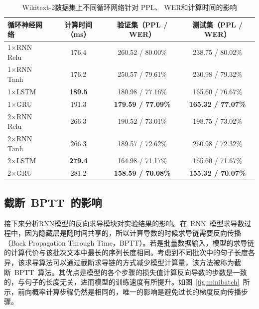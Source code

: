 \begin{table}[!ht]
  \centering
  \caption{Wikitext-2数据集上不同循环网络针对 PPL、 WER和计算时间的影响\label{tab:rnn}}
\begin{tabular}{lccc}
  \toprule
  循环神经网络 & 计算时间（ms）&验证集（PPL / WER） & 测试集（PPL / WER）\\ \midrule
  1$\times$RNN Relu~\cite{DBLP:journals/jmlr/GutmannH10} &176.4&260.52 / 80.00\%&238.75 / 80.02\%\\
  1$\times$RNN Tanh~\cite{DBLP:journals/iclr/JiVSAD15}   &176.2&250.57 / 79.61\%&230.98 / 79.32\%\\
  1$\times$LSTM~\cite{7508408}                  &\textbf{189.5}&180.98 / 77.16\%&165.60 / 76.67\%\\
  1$\times$GRU~\cite{DBLP:journals/corr/ChungGCB14}      &191.3&\textbf{179.59 / 77.09\%}&\textbf{165.32 / 77.07\%}\\ \midrule
  2$\times$RNN Relu~\cite{DBLP:journals/jmlr/GutmannH10} &266.3&190.52 / 73.01\%&198.75 / 73.02\%\\
  2$\times$RNN Tanh~\cite{DBLP:journals/iclr/JiVSAD15}   &266.3&189.57 / 72.62\%&260.98 / 72.32\%\\
  2$\times$LSTM~\cite{7508408}                  &\textbf{279.4}&164.98 / 71.17\%&165.60 / 71.67\%\\
  2$\times$GRU~\cite{DBLP:journals/corr/ChungGCB14}      &281.2&\textbf{158.59 / 70.08\%}&\textbf{155.32 / 70.07\%}\\
  \bottomrule
\end{tabular}
\end{table}

\subsection{截断~BPTT~的影响}
接下来分析RNN模型的反向求导模块对实验结果的影响。在~RNN~模型求导数过程中，因为隐藏层是随时间共享的，所以计算导数的时候求导链需要反向传播（Back Propagation Through Time，BPTT）。若是批量数据输入，模型的求导链的计算代价与该批次文本中最长的序列长度相同。考虑到不同批次中的句子长度各异，该求导算法可以通过截断求导链的方式减少模型计算量，该方法被称为截断~BPTT~算法。其优点是模型的各个步骤的损失值计算反向导数的步数是一致的，与句子的长度无关，进而模型的训练速度有所提升。如图~\ref{fig:minibatch}~所示，前向概率计算步骤仍然是相同的，唯一的影响是避免过长的梯度反向传播步骤。


